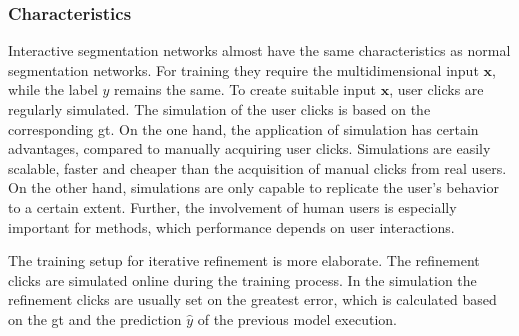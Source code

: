 \subsubsection{Characteristics}
Interactive segmentation networks almost have the same characteristics as normal segmentation networks.
For training they require the multidimensional input $\textbf{x}$, while the label $y$ remains the same.
To create suitable input $\textbf{x}$, user clicks are regularly simulated.
The simulation of the user clicks is based on the corresponding \gls{gt}.
On the one hand, the application of simulation has certain advantages, compared to manually acquiring user clicks.
Simulations are easily scalable, faster and cheaper than the acquisition of manual clicks from real users.
On the other hand, simulations are only capable to replicate the user's behavior to a certain extent.
Further, the involvement of human users is especially important for methods, which performance depends on user interactions.


The training setup for iterative refinement is more elaborate.
The refinement clicks are simulated online during the training process.
In the simulation the refinement clicks are usually set on the greatest error, which is calculated based on the \gls{gt} and the prediction $\hat{y}$ of the previous model execution.

